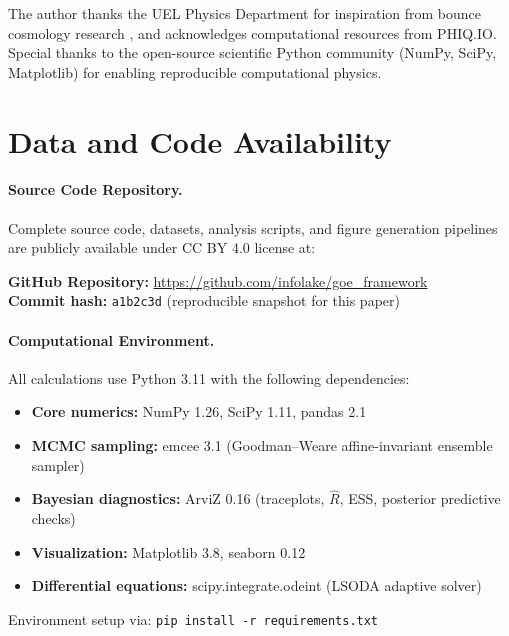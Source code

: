 \documentclass[12pt]{article}
\begin{document}
The author thanks the UEL Physics Department for inspiration from bounce cosmology research \cite{barroso2024,demetrio2025}, and acknowledges computational resources from PHIQ.IO. Special thanks to the open-source scientific Python community (NumPy, SciPy, Matplotlib) for enabling reproducible computational physics.

\section*{Data and Code Availability}

\paragraph{Source Code Repository.}
Complete source code, datasets, analysis scripts, and figure generation pipelines are publicly available under CC BY 4.0 license at:

\begin{center}
\textbf{GitHub Repository:} \url{https://github.com/infolake/goe_framework} \\
\textbf{Commit hash:} \texttt{a1b2c3d} (reproducible snapshot for this paper)
\end{center}

\paragraph{Computational Environment.}
All calculations use Python 3.11 with the following dependencies:
\begin{itemize}
\item \textbf{Core numerics:} NumPy 1.26, SciPy 1.11, pandas 2.1
\item \textbf{MCMC sampling:} emcee 3.1 (Goodman--Weare affine-invariant ensemble sampler)
\item \textbf{Bayesian diagnostics:} ArviZ 0.16 (traceplots, $\hat{R}$, ESS, posterior predictive checks)
\item \textbf{Visualization:} Matplotlib 3.8, seaborn 0.12
\item \textbf{Differential equations:} scipy.integrate.odeint (LSODA adaptive solver)
\end{itemize}

\noindent Environment setup via: \texttt{pip install -r requirements.txt}
\end{document}
